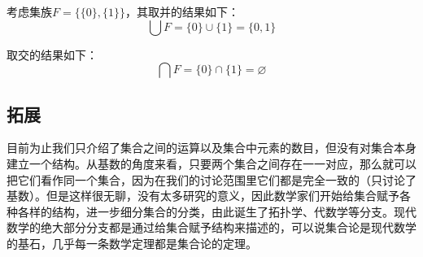 \begin{example}{}
考虑集族$F=\{\{0\}, \{1\}\}$，其取并的结果如下：
\begin{equation}
\bigcup F=\{0\}\cup\{1\}=\{0, 1\}
\end{equation}

取交的结果如下：
\begin{equation}
\bigcap F=\{0\}\cap\{1\}=\varnothing
\end{equation}
\end{example}



\subsection{拓展}
目前为止我们只介绍了集合之间的运算以及集合中元素的数目，但没有对集合本身建立一个结构。从基数的角度来看，只要两个集合之间存在一一对应，那么就可以把它们看作同一个集合，因为在我们的讨论范围里它们都是完全一致的（只讨论了基数）。但是这样很无聊，没有太多研究的意义，因此数学家们开始给集合赋予各种各样的结构，进一步细分集合的分类，由此诞生了拓扑学、代数学等分支。现代数学的绝大部分分支都是通过给集合赋予结构来描述的，可以说集合论是现代数学的基石，几乎每一条数学定理都是集合论的定理。
